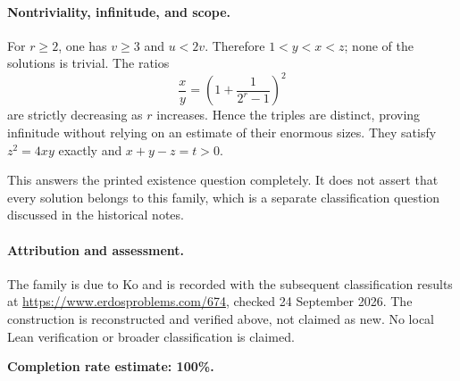 \paragraph{Nontriviality, infinitude, and scope.}
For \(r\geq2\), one has \(v\geq3\) and \(u<2v\). Therefore \(1<y<x<z\); none of the solutions is trivial. The ratios
\[
 \frac xy=\left(1+\frac1{2^r-1}\right)^2
\]
are strictly decreasing as \(r\) increases. Hence the triples are distinct, proving infinitude without relying on an estimate of their enormous sizes. They satisfy \(z^2=4xy\) exactly and \(x+y-z=t>0\).

This answers the printed existence question completely. It does not assert that every solution belongs to this family, which is a separate classification question discussed in the historical notes.

\paragraph{Attribution and assessment.}
The family is due to Ko and is recorded with the subsequent classification results at \url{https://www.erdosproblems.com/674}, checked 24 September 2026. The construction is reconstructed and verified above, not claimed as new. No local Lean verification or broader classification is claimed.

\textbf{Completion rate estimate: 100\%.}
